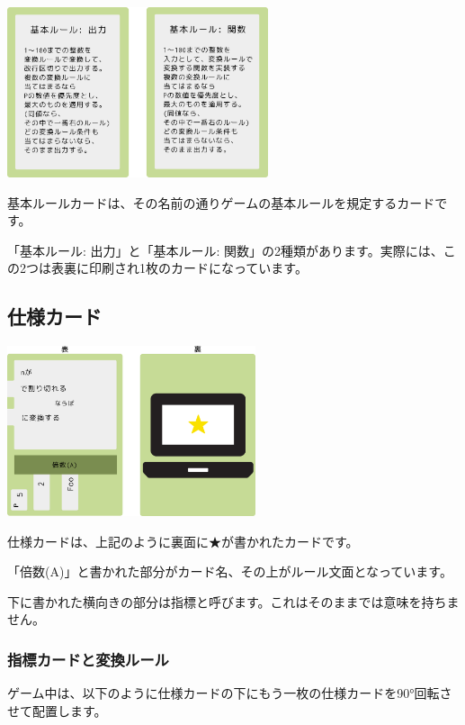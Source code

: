 \documentclass[index]{subfiles}
\begin{document}
\begin{center}
  \includegraphics[height=5cm]{image/101_basic_rule_card.png}
\end{center}

{\sf 基本ルールカード}は、その名前の通りゲームの基本ルールを規定するカードです。

「基本ルール: 出力」と「基本ルール: 関数」の2種類があります。実際には、この2つは表裏に印刷され1枚のカードになっています。

  \subsection{仕様カード}
  \label{subsec:spec_card}

\begin{center}
  \includegraphics[height=5cm]{image/102_spec_card.png}
\end{center}

{\sf 仕様カード}は、上記のように裏面に★が書かれたカードです。

「倍数(A)」と書かれた部分が{\sf カード名}、その上が{\sf ルール文面}となっています。

下に書かれた横向きの部分は{\sf 指標}と呼びます。これはそのままでは意味を持ちません。

  \subsubsection{指標カードと変換ルール}

ゲーム中は、以下のように仕様カードの下にもう一枚の仕様カードを90°回転させて配置します。
\end{document}
